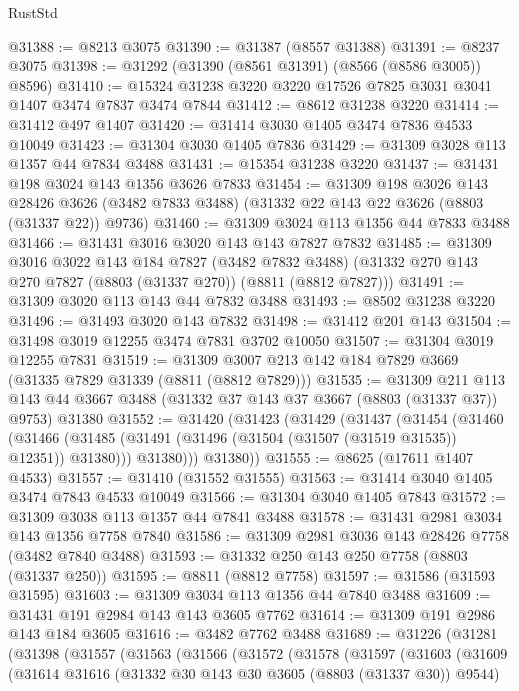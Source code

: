 \begin{lexlean}{RustStd}
\begin{coremodule}
@31388 := @8213 @3075
@31390 := @31387 (@8557 @31388)
@31391 := @8237 @3075
@31398 := @31292 (@31390 (@8561 @31391) (@8566 (@8586 @3005)) @8596)
@31410 := @15324 @31238 @3220 @3220 @17526 @7825 @3031 @3041 @1407 @3474 @7837 @3474 @7844
@31412 := @8612 @31238 @3220
@31414 := @31412 @497 @1407
@31420 := @31414 @3030 @1405 @3474 @7836 @4533 @10049
@31423 := @31304 @3030 @1405 @7836
@31429 := @31309 @3028 @113 @1357 @44 @7834 @3488
@31431 := @15354 @31238 @3220
@31437 := @31431 @198 @3024 @143 @1356 @3626 @7833
@31454 := @31309
    @198
    @3026
    @143
    @28426
    @3626
    (@3482 @7833 @3488)
    (@31332 @22 @143 @22 @3626 (@8803 (@31337 @22)) @9736)
@31460 := @31309 @3024 @113 @1356 @44 @7833 @3488
@31466 := @31431 @3016 @3020 @143 @143 @7827 @7832
@31485 := @31309
    @3016
    @3022
    @143
    @184
    @7827
    (@3482 @7832 @3488)
    (@31332 @270 @143 @270 @7827 (@8803 (@31337 @270)) (@8811 (@8812 @7827)))
@31491 := @31309 @3020 @113 @143 @44 @7832 @3488
@31493 := @8502 @31238 @3220
@31496 := @31493 @3020 @143 @7832
@31498 := @31412 @201 @143
@31504 := @31498 @3019 @12255 @3474 @7831 @3702 @10050
@31507 := @31304 @3019 @12255 @7831
@31519 := @31309 @3007 @213 @142 @184 @7829 @3669 (@31335 @7829 @31339 (@8811 (@8812 @7829)))
@31535 := @31309
    @211
    @113
    @143
    @44
    @3667
    @3488
    (@31332 @37 @143 @37 @3667 (@8803 (@31337 @37)) @9753)
    @31380
@31552 := @31420
    (@31423
      (@31429
        (@31437
          (@31454
            (@31460
              (@31466 (@31485 (@31491 (@31496 (@31504 (@31507 (@31519 @31535)) @12351)) @31380)))
              @31380)))
        @31380))
@31555 := @8625 (@17611 @1407 @4533)
@31557 := @31410 (@31552 @31555)
@31563 := @31414 @3040 @1405 @3474 @7843 @4533 @10049
@31566 := @31304 @3040 @1405 @7843
@31572 := @31309 @3038 @113 @1357 @44 @7841 @3488
@31578 := @31431 @2981 @3034 @143 @1356 @7758 @7840
@31586 := @31309 @2981 @3036 @143 @28426 @7758 (@3482 @7840 @3488)
@31593 := @31332 @250 @143 @250 @7758 (@8803 (@31337 @250))
@31595 := @8811 (@8812 @7758)
@31597 := @31586 (@31593 @31595)
@31603 := @31309 @3034 @113 @1356 @44 @7840 @3488
@31609 := @31431 @191 @2984 @143 @143 @3605 @7762
@31614 := @31309 @191 @2986 @143 @184 @3605
@31616 := @3482 @7762 @3488
@31689 := @31226
    (@31281
      (@31398
        (@31557
          (@31563
            (@31566
              (@31572
                (@31578
                  (@31597
                    (@31603
                      (@31609
                        (@31614
                          @31616
                          (@31332 @30 @143 @30 @3605 (@8803 (@31337 @30)) @9544)

\end{coremodule}
\end{lexlean}
